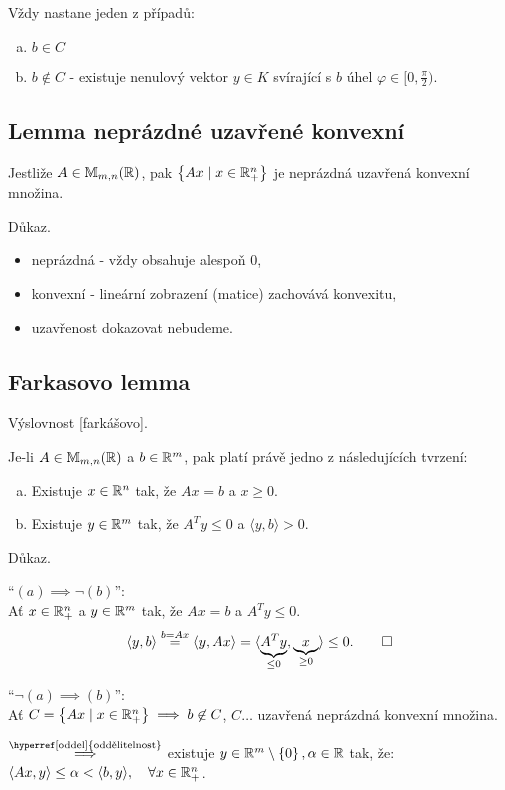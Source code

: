 Vždy nastane jeden z případů:
\begin{enumerate}[(a)]
    \item $b \in C$
    \item $b \not\in C$ - existuje nenulový vektor $y \in K$ svírající s $b$ úhel $\varphi \in [0, \frac{\pi}{2})$.
\end{enumerate}

\subsection{Lemma neprázdné uzavřené konvexní}
Jestliže $A \in \mathbb{M}_{m,n}(\mathbb{R})$, pak $\left\lbrace Ax \mid x \in \mathbb{R}_+^n \right\rbrace$ je neprázdná uzavřená konvexní množina.

Důkaz.
\begin{itemize}
    \item neprázdná - vždy obsahuje alespoň $0$,
    \item konvexní - lineární zobrazení (matice) zachovává konvexitu,
    \item uzavřenost dokazovat nebudeme.
\end{itemize}
\newpage
\subsection{Farkasovo lemma}\label{farkas}
Výslovnost [farkášovo].

Je-li $A \in \mathbb{M}_{m,n}(\mathbb{R})$ a $b \in \mathbb{R}^m$, pak platí právě jedno z následujících tvrzení:
\begin{enumerate}[(a)]
    \item Existuje $x \in \mathbb{R}^n$ tak, že $Ax = b$ a $x \geq 0$.
    \item Existuje $y \in \mathbb{R}^m$ tak, že $A^Ty \leq 0$ a $\langle y, b\rangle > 0$.
\end{enumerate}

Důkaz.

\enquote{$(a) \implies \lnot (b)$}:\\
Ať $x \in \mathbb{R}^n_+$ a $y \in \mathbb{R}^m$ tak, že $Ax = b$ a $A^T y \leq 0$.
\[
    \langle y, b\rangle \stackrel{b= Ax}{=} \langle y, Ax\rangle = \langle \underbrace{A^Ty}_{\leq 0}, 
    \underbrace{x}_{\geq 0}\rangle \leq 0. \qed 
\]

\enquote{$\lnot (a) \implies (b)$}:\\
Ať $C = \left\lbrace Ax \mid x \in \mathbb{R}^n_+ \right\rbrace \implies b \not\in C$, $C \dots$ uzavřená neprázdná konvexní množina.

$\stackrel{\text{\hyperref[oddel]{oddělitelnost}}}{\implies}$ existuje $y \in \mathbb{R}^m \setminus \left\lbrace 0 \right\rbrace, \alpha \in \mathbb{R}$ tak, 
že: $\langle Ax, y\rangle \leq \alpha < \langle b, y\rangle, \quad \forall x \in \mathbb{R}^n_+$.

